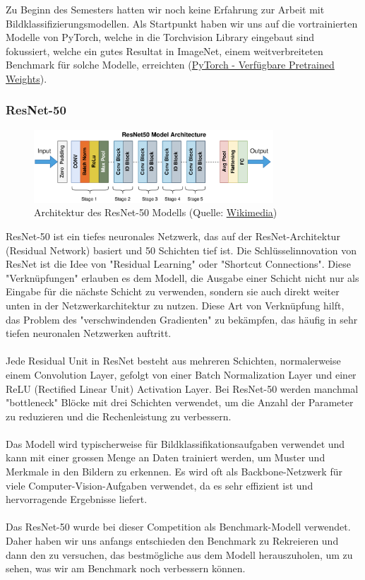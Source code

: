 \documentclass{article}
\begin{document}
Zu Beginn des Semesters hatten wir noch keine Erfahrung zur Arbeit mit Bildklassifizierungsmodellen. Als Startpunkt haben wir uns auf die vortrainierten Modelle von PyTorch, welche in die Torchvision Library eingebaut sind fokussiert, welche ein gutes Resultat in ImageNet, einem weitverbreiteten Benchmark für solche Modelle, erreichten (\href{https://pytorch.org/vision/stable/models.html#table-of-all-available-classification-weights}{PyTorch - Verfügbare Pretrained Weights}).

\subsubsection{ResNet-50}

\begin{figure}[!h]
    \centering
    \includegraphics[width=0.8\textwidth]{images/model_architecture/resnet.png}
    \caption{\label{fig:resnet_50_architecture}Architektur des ResNet-50 Modells (Quelle: \href{https://commons.wikimedia.org/wiki/File:ResNet50.png}{Wikimedia})}
\end{figure}

ResNet-50 \cite{he_deep_2015} ist ein tiefes neuronales Netzwerk, das auf der ResNet-Architektur (Residual Network) basiert und 50 Schichten tief ist. Die Schlüsselinnovation von ResNet ist die Idee von "Residual Learning" oder "Shortcut Connections". Diese "Verknüpfungen" erlauben es dem Modell, die Ausgabe einer Schicht nicht nur als Eingabe für die nächste Schicht zu verwenden, sondern sie auch direkt weiter unten in der Netzwerkarchitektur zu nutzen. Diese Art von Verknüpfung hilft, das Problem des "verschwindenden Gradienten" zu bekämpfen, das häufig in sehr tiefen neuronalen Netzwerken auftritt.\\\\
Jede Residual Unit in ResNet besteht aus mehreren Schichten, normalerweise einem Convolution Layer, gefolgt von einer Batch Normalization Layer und einer ReLU (Rectified Linear Unit) Activation Layer. Bei ResNet-50 werden manchmal "bottleneck" Blöcke mit drei Schichten verwendet, um die Anzahl der Parameter zu reduzieren und die Rechenleistung zu verbessern.\\\\
Das Modell wird typischerweise für Bildklassifikationsaufgaben verwendet und kann mit einer grossen Menge an Daten trainiert werden, um Muster und Merkmale in den Bildern zu erkennen. Es wird oft als Backbone-Netzwerk für viele Computer-Vision-Aufgaben verwendet, da es sehr effizient ist und hervorragende Ergebnisse liefert. \\\\
Das ResNet-50 wurde bei dieser Competition als Benchmark-Modell verwendet. Daher haben wir uns anfangs entschieden den Benchmark zu Rekreieren und dann den zu versuchen, das bestmögliche aus dem Modell herauszuholen, um zu sehen, was wir am Benchmark noch verbessern können.
\end{document}
